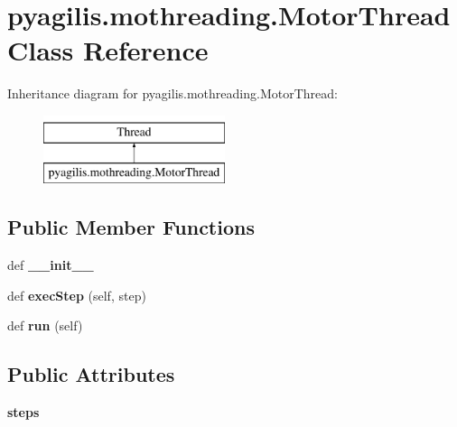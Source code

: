 \hypertarget{classpyagilis_1_1mothreading_1_1_motor_thread}{}\section{pyagilis.\+mothreading.\+Motor\+Thread Class Reference}
\label{classpyagilis_1_1mothreading_1_1_motor_thread}
Inheritance diagram for pyagilis.\+mothreading.\+Motor\+Thread\+:\begin{figure}[H]
\begin{center}
\leavevmode
\includegraphics[height=2.000000cm]{classpyagilis_1_1mothreading_1_1_motor_thread}
\end{center}
\end{figure}
\subsection*{Public Member Functions}
\begin{DoxyCompactItemize}
\item 
\hypertarget{classpyagilis_1_1mothreading_1_1_motor_thread_a48ac0fde5f66cbf50b74ad97ebf2403f}{}def {\bfseries \+\_\+\+\_\+init\+\_\+\+\_\+}\label{classpyagilis_1_1mothreading_1_1_motor_thread_a48ac0fde5f66cbf50b74ad97ebf2403f}

\item 
\hypertarget{classpyagilis_1_1mothreading_1_1_motor_thread_a4a51f3fdb44af60ad64fa8e22e0f78ba}{}def {\bfseries exec\+Step} (self, step)\label{classpyagilis_1_1mothreading_1_1_motor_thread_a4a51f3fdb44af60ad64fa8e22e0f78ba}

\item 
\hypertarget{classpyagilis_1_1mothreading_1_1_motor_thread_a29e5e8f8580ef07c95659141728f510f}{}def {\bfseries run} (self)\label{classpyagilis_1_1mothreading_1_1_motor_thread_a29e5e8f8580ef07c95659141728f510f}

\end{DoxyCompactItemize}
\subsection*{Public Attributes}
\begin{DoxyCompactItemize}
\item 
\hypertarget{classpyagilis_1_1mothreading_1_1_motor_thread_aeee40a6960f096100572247eb19e21d8}{}{\bfseries steps}\label{classpyagilis_1_1mothreading_1_1_motor_thread_aeee40a6960f096100572247eb19e21d8}

\end{DoxyCompactItemize}
